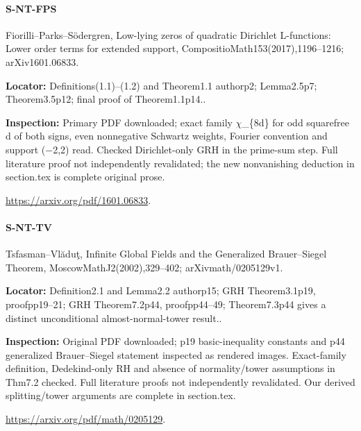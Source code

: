 \documentclass[11pt,a4paper]{article}
\begin{document}
\paragraph{S-NT-FPS} Fiorilli–\allowbreak{}Parks–\allowbreak{}Södergren, Low-lying zeros of quadratic Dirichlet L-functions:\allowbreak{} Lower order terms for extended support, CompositioMath153(2017),1196–\allowbreak{}1216; arXiv1601.\allowbreak{}06833.

\textbf{Locator:} Definitions(1.\allowbreak{}1)–\allowbreak{}(1.\allowbreak{}2) and Theorem1.\allowbreak{}1 authorp2; Lemma2.\allowbreak{}5p7; Theorem3.\allowbreak{}5p12; final proof of Theorem1.\allowbreak{}1p14.\allowbreak{}.

\textbf{Inspection:} Primary PDF downloaded; exact family \ensuremath{\chi}\_\allowbreak{}\{8d\} for odd squarefree d of both signs, even nonnegative Schwartz weights, Fourier convention and support (\ensuremath{-}2,2) read.\allowbreak{} Checked Dirichlet-only GRH in the prime-sum step.\allowbreak{} Full literature proof not independently revalidated; the new nonvanishing deduction in section.\allowbreak{}tex is complete original prose.\allowbreak{}

\url{https://arxiv.org/pdf/1601.06833}.

\paragraph{S-NT-TV} Tsfasman–\allowbreak{}Vlăduţ, Infinite Global Fields and the Generalized Brauer–\allowbreak{}Siegel Theorem, MoscowMathJ2(2002),329–\allowbreak{}402; arXivmath/\allowbreak{}0205129v1.

\textbf{Locator:} Definition2.\allowbreak{}1 and Lemma2.\allowbreak{}2 authorp15; GRH Theorem3.\allowbreak{}1p19, proofpp19–\allowbreak{}21; GRH Theorem7.\allowbreak{}2p44, proofpp44–\allowbreak{}49; Theorem7.\allowbreak{}3p44 gives a distinct unconditional almost-normal-tower result.\allowbreak{}.

\textbf{Inspection:} Original PDF downloaded; p19 basic-inequality constants and p44 generalized Brauer–\allowbreak{}Siegel statement inspected as rendered images.\allowbreak{} Exact-family definition, Dedekind-only RH and absence of normality/\allowbreak{}tower assumptions in Thm7.\allowbreak{}2 checked.\allowbreak{} Full literature proofs not independently revalidated.\allowbreak{} Our derived splitting/\allowbreak{}tower arguments are complete in section.\allowbreak{}tex.\allowbreak{}

\url{https://arxiv.org/pdf/math/0205129}.
\end{document}
